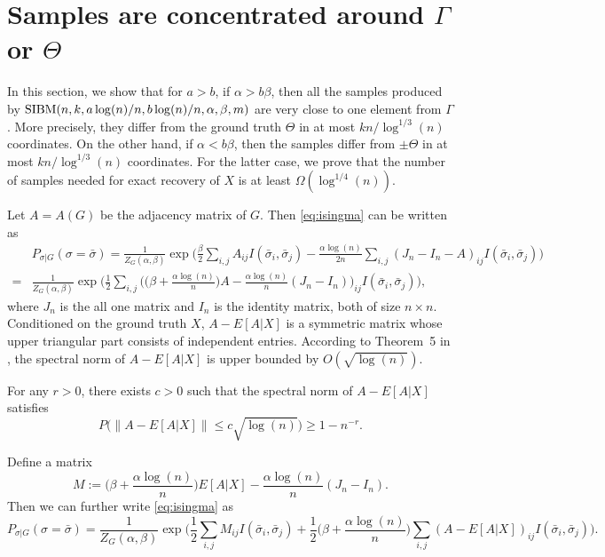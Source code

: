 \documentclass{article}
\begin{document}
\section{Samples are concentrated around $\Gamma$ or $\Theta$} \label{sect:aln}
In this section, we show that for $a>b$, if $\alpha>b\beta$, then all the samples produced by $\SIBM(n, k,\linebreak[4]
a\log(n)/n, b\log(n)/n,\alpha,\beta,m)$ are very close to one element from $\Gamma$. More precisely, they differ from the ground truth $\Theta$ in at most $kn/\log^{1/3}(n)$ coordinates.
On the other hand, if $\alpha<b\beta$, then the samples differ from  $\pm \Theta$ in at most $kn/\log^{1/3}(n)$ coordinates.
For the latter case, we prove that the number of samples needed for exact recovery of $X$ is at least $\Omega(\log^{1/4}(n))$.

Let $A=A(G)$ be the adjacency matrix of $G$. Then \eqref{eq:isingma} can be written as
\begin{align*}
& P_{\sigma|G}(\sigma=\bar{\sigma})=\frac{1}{Z_G(\alpha,\beta)}
\exp\Big(\frac{\beta}{2} \sum_{i,j} A_{ij} I(\bar{\sigma}_i,\bar{\sigma}_j)
-\frac{\alpha\log(n)}{2n} \sum_{i,j} (J_n-I_n-A)_{ij} I(\bar{\sigma}_i, \bar{\sigma}_j)
\Big)  \\
= & \frac{1}{Z_G(\alpha,\beta)}
\exp\Big( \frac{1}{2} \sum_{i,j} \Big( \big(\beta+\frac{\alpha\log(n)}{n} \big) A
-\frac{\alpha\log(n)}{n} (J_n-I_n) \Big)_{ij} I(\bar{\sigma}_i,\bar{\sigma}_j)
\Big),
\end{align*}
where $J_n$ is the all one matrix and $I_n$ is the identity matrix, both of size $n\times n$.
Conditioned on the ground truth $X$,
$A-E[A|X]$ is a symmetric matrix whose upper triangular part consists of independent entries. According to Theorem~5 in \cite{Hajek16}, the spectral norm of $A-E[A|X]$ is upper bounded by $O(\sqrt{\log(n)})$.
\begin{theorem} \label{thm:a2}
For any $r>0$, there exists $c>0$ such that the spectral norm of $A-E[A|X]$ satisfies
$$
P\big(\|A-E[A|X]\| \le c\sqrt{\log(n)} \big)\ge 1-n^{-r} .
$$
\end{theorem}
Define a matrix
$$
M:= \big(\beta+\frac{\alpha\log(n)}{n} \big) E[A|X]
-\frac{\alpha\log(n)}{n} (J_n-I_n).
$$
Then we can further write \eqref{eq:isingma}
as
\begin{equation} \label{eq:M}
P_{\sigma|G}(\sigma=\bar{\sigma})
= \frac{1}{Z_G(\alpha,\beta)}
\exp\Big( \frac{1}{2} \sum_{i,j}M_{ij} I(\bar{\sigma}_i, \bar{\sigma}_j) + \frac{1}{2}\big(\beta+\frac{\alpha\log(n)}{n} \big)  \sum_{i,j}  (A-E[A|X])_{ij}
 I(\bar{\sigma}_i, \bar{\sigma}_j)  
\Big)  .
\end{equation}
\end{document}
